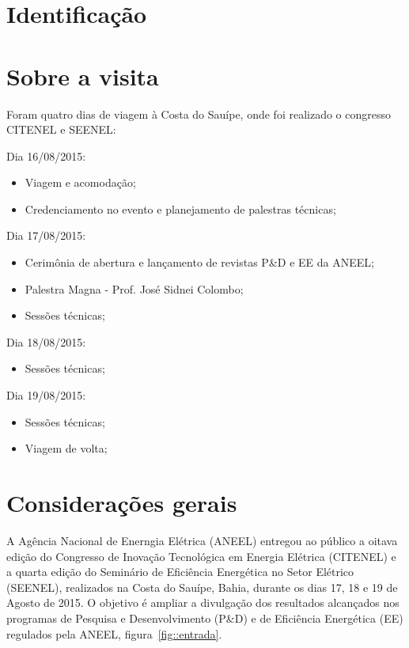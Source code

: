 \documentclass[12pt,a4paper]{article}
\begin{document}



\newpage%
\section{Identificação}



\newpage%
\section{Sobre a visita}
Foram quatro dias de viagem à Costa do Sauípe, onde foi realizado o congresso
CITENEL e SEENEL:

Dia 16/08/2015:
\begin{itemize}
  \item Viagem e acomodação;
  \item Credenciamento no evento e planejamento de palestras técnicas;
\end{itemize}

Dia 17/08/2015:
\begin{itemize}
  \item Cerimônia de abertura e lançamento de revistas P\&D e EE da ANEEL;
  \item Palestra Magna - Prof. José Sidnei Colombo;
  \item Sessões técnicas;
\end{itemize}

Dia 18/08/2015:
\begin{itemize}
  \item Sessões técnicas;
\end{itemize}

Dia 19/08/2015:
\begin{itemize}
  \item Sessões técnicas;
  \item Viagem de volta;
\end{itemize}

\section{Considerações gerais}
A Agência Nacional de Enerngia Elétrica (ANEEL) entregou ao público a oitava
edição do Congresso de Inovação Tecnológica em Energia Elétrica (CITENEL) e a
quarta edição do Seminário de Eficiência Energética no Setor Elétrico (SEENEL),
realizados na Costa do Sauípe, Bahia, durante os dias 17, 18 e 19 de Agosto de
2015. O objetivo é ampliar a divulgação dos resultados alcançados nos
programas de Pesquisa e Desenvolvimento (P\&D) e de Eficiência Energética (EE)
regulados pela ANEEL, figura~\ref{fig::entrada}.
\end{document}
